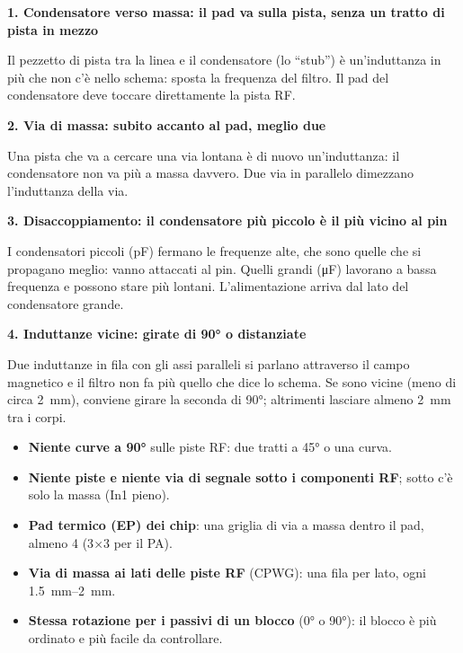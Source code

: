 \documentclass[a4paper,11pt]{article}
\newcommand{\esempio}[3]{%
  \noindent\begin{minipage}[t]{\linewidth}{\sffamily\bfseries\small #1}\par\smallskip
  \begin{minipage}[t]{0.48\linewidth}\centering\end{minipage}\hfill
  \begin{minipage}[t]{0.48\linewidth}\centering\end{minipage}\end{minipage}\par\medskip}
\begin{document}
\esempio{1. Condensatore verso massa: il pad va sulla pista, senza un tratto di pista in mezzo}{blk_es_stub_no}{blk_es_stub_si}
{\small Il pezzetto di pista tra la linea e il condensatore (lo \enquote{stub}) è un'induttanza in più che non c'è nello schema: sposta la frequenza del filtro. Il pad del condensatore deve toccare direttamente la pista RF.}\par\medskip

\esempio{2. Via di massa: subito accanto al pad, meglio due}{blk_es_via_no}{blk_es_via_si}
{\small Una pista che va a cercare una via lontana è di nuovo un'induttanza: il condensatore non va più a massa davvero. Due via in parallelo dimezzano l'induttanza della via.}\par\medskip

\esempio{3. Disaccoppiamento: il condensatore più piccolo è il più vicino al pin}{blk_es_dec_no}{blk_es_dec_si}
{\small I condensatori piccoli (\si{pF}) fermano le frequenze alte, che sono quelle che si propagano meglio: vanno attaccati al pin. Quelli grandi (\si{\micro F}) lavorano a bassa frequenza e possono stare più lontani. L'alimentazione arriva dal lato del condensatore grande.}\par\medskip

\esempio{4. Induttanze vicine: girate di \ang{90} o distanziate}{blk_es_ind_no}{blk_es_ind_si}
{\small Due induttanze in fila con gli assi paralleli si parlano attraverso il campo magnetico e il filtro non fa più quello che dice lo schema. Se sono vicine (meno di circa \SI{2}{mm}), conviene girare la seconda di \ang{90}; altrimenti lasciare almeno \SI{2}{mm} tra i corpi.}\par\medskip

\begin{regola}
\begin{itemize}[nosep]
\item \textbf{Niente curve a \ang{90}} sulle piste RF: due tratti a \ang{45} o una curva.
\item \textbf{Niente piste e niente via di segnale sotto i componenti RF}; sotto c'è solo la massa (In1 pieno).
\item \textbf{Pad termico (EP) dei chip}: una griglia di via a massa dentro il pad, almeno 4 (3$\times$3 per il PA).
\item \textbf{Via di massa ai lati delle piste RF} (CPWG): una fila per lato, ogni \SIrange{1.5}{2}{mm}.
\item \textbf{Stessa rotazione per i passivi di un blocco} (\ang{0} o \ang{90}): il blocco è più ordinato e più facile da controllare.
\end{itemize}
\end{regola}
\end{document}
